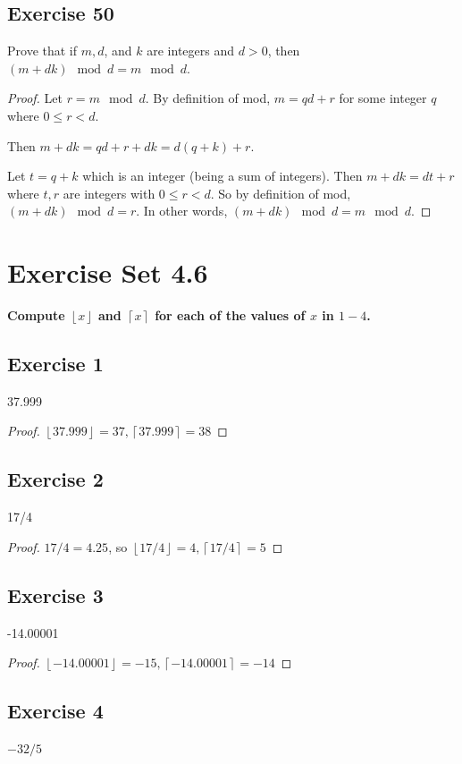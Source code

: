 \documentclass[14pt]{extarticle}
\newcommand{\cy}{\color{cyan}}
\newcommand{\floor}[1]{{\left\lfloor#1\right\rfloor}}
\newcommand{\ceil}[1]{{\left\lceil#1\right\rceil}}
\begin{document}
\subsection{Exercise 50}
Prove that if $m, d$, and $k$ are integers and $d > 0$, then $(m + dk) \mod d = m \mod d$.

\begin{proof}
Let $r = m \mod d$. By definition of mod, $m = qd+r$ for some integer $q$ where $0 \leq r < d$. 

Then $m + dk = qd+r+dk = d(q+k)+r$.

Let $t = q+k$ which is an integer (being a sum of integers). Then $m+dk = dt + r$ where $t,r$ are integers with $0 \leq r < d$. So by definition of mod, $(m+dk) \mod d = r$. In other words, $(m + dk) \mod d = m \mod d$.
\end{proof}

\section{Exercise Set 4.6}
{\bf \cy Compute $\floor{x}$ and $\ceil{x}$ for each of the values of $x$ in $1-4$.}

\subsection{Exercise 1}
37.999

\begin{proof}
$\floor{37.999} = 37, \ceil{37.999} = 38$
\end{proof}

\subsection{Exercise 2}
17/4

\begin{proof}
$17/4 = 4.25$, so $\floor{17/4} = 4, \ceil{17/4} = 5$
\end{proof}

\subsection{Exercise 3}
-14.00001

\begin{proof}
$\floor{-14.00001} = -15, \ceil{-14.00001} = -14$
\end{proof}

\subsection{Exercise 4}
$-32/5$
\end{document}

